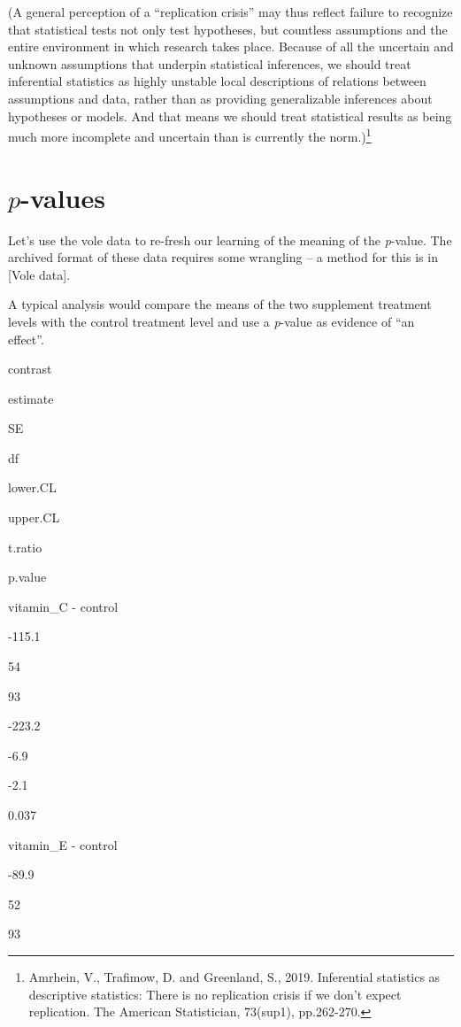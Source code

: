 \documentclass[]{book}
\let\rmarkdownfootnote\footnote%
\def\footnote{\protect\rmarkdownfootnote}
\begin{document}
(A general perception of a ``replication crisis'' may thus reflect failure to recognize that statistical tests not only test hypotheses, but countless assumptions and the entire environment in which research takes place. Because of all the uncertain and unknown assumptions that underpin statistical inferences, we should treat inferential statistics as highly unstable local descriptions of relations between assumptions and data, rather than as providing generalizable inferences about hypotheses or models. And that means we should treat statistical results as being much more incomplete and uncertain than is currently the norm.)\footnote{Amrhein, V., Trafimow, D. and Greenland, S., 2019. Inferential statistics as descriptive statistics: There is no replication crisis if we don't expect replication. The American Statistician, 73(sup1), pp.262-270.}

\hypertarget{p-values-1}{%
\section{\texorpdfstring{\(p\)-values}{p-values}}\label{p-values-1}}

Let's use the vole data to re-fresh our learning of the meaning of the \emph{p}-value. The archived format of these data requires some wrangling -- a method for this is in {[}Vole data{]}.

A typical analysis would compare the means of the two supplement treatment levels with the control treatment level and use a \emph{p}-value as evidence of ``an effect''.

contrast

estimate

SE

df

lower.CL

upper.CL

t.ratio

p.value

vitamin\_C - control

-115.1

54

93

-223.2

-6.9

-2.1

0.037

vitamin\_E - control

-89.9

52

93
\end{document}
